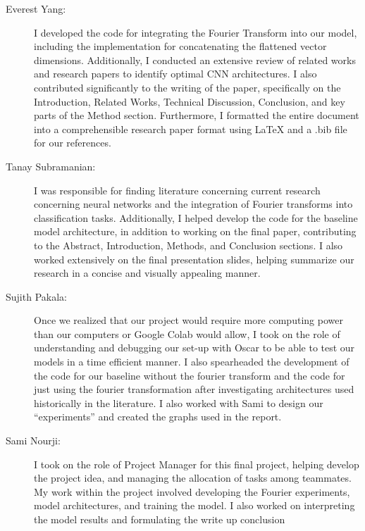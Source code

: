\begin{description}

\item[Everest Yang:] I developed the code for integrating the Fourier Transform into our model, including the implementation for concatenating the flattened vector dimensions. Additionally, I conducted an extensive review of related works and research papers to identify optimal CNN architectures. I also contributed significantly to the writing of the paper, specifically on the Introduction, Related Works, Technical Discussion, Conclusion, and key parts of the Method section. Furthermore, I formatted the entire document into a comprehensible research paper format using LaTeX and a .bib file for our references.

\item[Tanay Subramanian:] I was responsible for finding literature concerning current research concerning neural networks and the integration of Fourier transforms into classification tasks. Additionally, I helped develop the code for the baseline model architecture, in addition to working on the final paper, contributing to the Abstract, Introduction, Methods, and Conclusion sections. I also worked extensively on the final presentation slides, helping summarize our research in a concise and visually appealing manner.

\item[Sujith Pakala:] Once we realized that our project would require more computing power than our computers or Google Colab would allow, I took on the role of understanding and debugging our set-up with Oscar to be able to test our models in a time efficient manner. I also spearheaded the development of the code for our baseline without the fourier transform and the code for just using the fourier transformation after investigating architectures used historically in the literature. I also worked with Sami to design our “experiments” and created the graphs used in the report. 

\item[Sami Nourji:] I took on the role of Project Manager for this final project, helping develop the project idea, and managing the allocation of tasks among teammates. My work within the project involved developing the Fourier experiments, model architectures, and training the model. I also worked on interpreting the model results and formulating the write up conclusion



\end{description}


